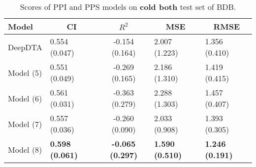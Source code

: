 \begin{table}
\centering
\caption{Scores of PPI and PPS models on \textbf{cold both} test set of BDB.}
\label{tab:ddi_ci_r2}
\begin{tabular}{|l|l|c|l|l|} 
\hline
Model & \multicolumn{1}{c|}{CI} & $R^2$ & \multicolumn{1}{c|}{MSE} & \multicolumn{1}{c|}{RMSE} \\ 
\hline
DeepDTA & 0.554 (0.047) & -0.154 (0.164) & 2.007 (1.223) & 1.356 (0.410) \\ 
\hline
Model (5) & 0.551 (0.049) & -0.269 (0.165) & 2.186 (1.310) & 1.419 (0.415) \\ 
\hline
Model (6) & 0.561 (0.031) & -0.363 (0.279) & 2.288 (1.303) & 1.457 (0.407) \\ 
\hline
Model (7) & 0.557 (0.036) & -0.260 (0.090) & 2.033 (0.908) & 1.393 (0.305) \\ 
\hline
Model (8) & \textbf{0.598 (0.061)} & \textbf{-0.065 (0.297)} & \textbf{1.590 (0.510)} & \textbf{1.246 (0.191)} \\
\hline
\end{tabular}
\label{tab:ppi_vs_pps_cold_both}
\end{table}